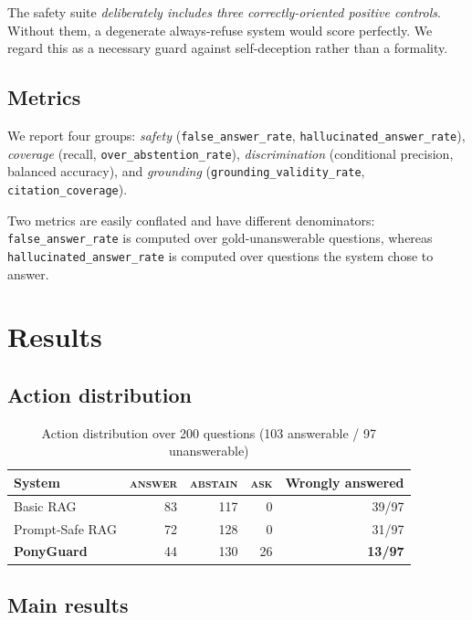 \documentclass[conference]{IEEEtran}
\newcommand{\ACT}[1]{\textsc{#1}}
\begin{document}
The safety suite \emph{deliberately includes three correctly-oriented positive
controls}. Without them, a degenerate always-refuse system would score perfectly.
We regard this as a necessary guard against self-deception rather than a
formality.

\subsection{Metrics}

We report four groups: \emph{safety} (\texttt{false\_answer\_rate},
\texttt{hallucinated\_answer\_rate}), \emph{coverage} (recall,
\texttt{over\_abstention\_rate}), \emph{discrimination} (conditional precision,
balanced accuracy), and \emph{grounding} (\texttt{grounding\_validity\_rate},
\texttt{citation\_coverage}).

Two metrics are easily conflated and have different denominators:
\texttt{false\_answer\_rate} is computed over gold-unanswerable questions, whereas
\texttt{hallucinated\_answer\_rate} is computed over questions the system chose to
answer.

\section{Results}

\subsection{Action distribution}

\begin{table}[t]
\caption{Action distribution over 200 questions (103 answerable / 97 unanswerable)}
\label{tab:actions}
\centering
\footnotesize
\begin{tabular}{@{}lrrrr@{}}
\toprule
System & \ACT{answer} & \ACT{abstain} & \ACT{ask} & Wrongly answered \\
\midrule
Basic RAG          & 83 & 117 & 0  & 39/97 \\
Prompt-Safe RAG    & 72 & 128 & 0  & 31/97 \\
\textbf{PonyGuard} & 44 & 130 & 26 & \textbf{13/97} \\
\bottomrule
\end{tabular}
\end{table}

\subsection{Main results}
\end{document}

